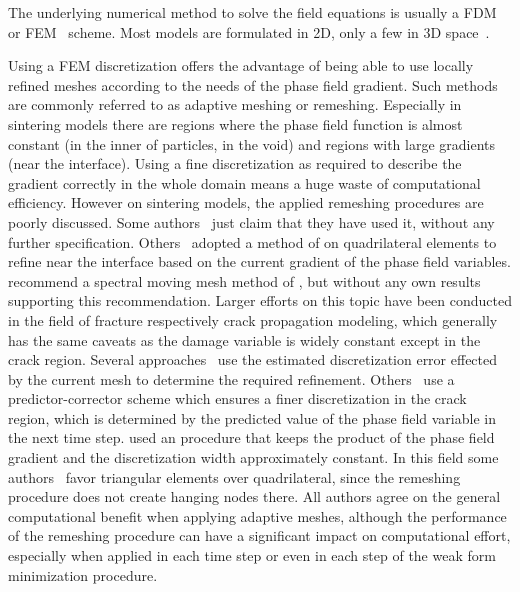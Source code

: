 The underlying numerical method to solve the field equations is usually a \gls{FDM}~\cite{Wang2006, Hotzer2019, Jing2003, Kumar2010, Kumar2011, Zhang2014} or \gls{FEM}~\cite{Asp2006, Chockalingam2016, Biswas2016, Biswas2017, Greenquist2020, Ivannikov2021} scheme.
Most models are formulated in 2D, only a few in 3D space~\cite{Greenquist2020, Termuhlen2021}.

Using a \gls{FEM} discretization offers the advantage of being able to use locally refined meshes according to the needs of the phase field gradient.
Such methods are commonly referred to as adaptive meshing or remeshing.
Especially in sintering models there are regions where the phase field function is almost constant (in the inner of particles, in the void) and regions with large gradients (near the interface).
Using a fine discretization as required to describe the gradient correctly in the whole domain means a huge waste of computational efficiency.
However on sintering models, the applied remeshing procedures are poorly discussed.
Some authors~\cite{Asp2006, Greenquist2020, Ivannikov2021} just claim that they have used it, without any further specification.
Others~\cite{Chockalingam2016, Biswas2016, Biswas2017} adopted a method of \textcite{Tonks2012} on quadrilateral elements to refine near the interface based on the current gradient of the phase field variables.
\textcite{Moelans2008} recommend a spectral moving mesh method of \textcite{Feng2006}, but without any own results supporting this recommendation.
Larger efforts on this topic have been conducted in the field of fracture respectively crack propagation modeling, which generally has the same caveats as the damage variable is widely constant except in the crack region.
Several approaches~\cite{Burke2010, Artina2015, Ferro2018, Micheletti2018, Hirshikesh2019, Goswami2019} use the estimated discretization error effected by the current mesh to determine the required refinement.
Others~\cite{Heister2015, Badnava2018, Tian2019} use a predictor-corrector scheme which ensures a finer discretization in the crack region, which is determined by the predicted value of the phase field variable in the next time step.
\textcite{Klinsmann2015} used an procedure that keeps the product of the phase field gradient and the discretization width approximately constant.
In this field some authors~\cite{Burke2010, Artina2015, Ferro2018, Micheletti2018} favor triangular elements over quadrilateral, since the remeshing procedure does not create hanging nodes there.
All authors agree on the general computational benefit when applying adaptive meshes, although the performance of the remeshing procedure can have a significant impact on computational effort, especially when applied in each time step or even in each step of the weak form minimization procedure.
